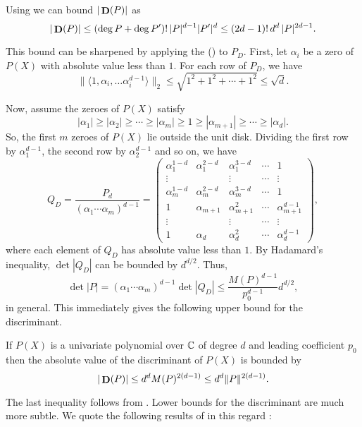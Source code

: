 \medskip
Using  we can bound $|\mathop{\mathbf{D}}\nolimits(P)|$ as
\begin{equation}\label{PB:DiscrmBound1:Eq}
|\mathop{\mathbf{D}}\nolimits(P)| \le (\deg P + \deg P')! \,|P|^{d-1} |P'|^d \le (2d-1)! \,d^d\,
|P|^{2d-1}.
\end{equation}


This bound can be sharpened by applying the 
() to $P_D$.  First, let $\alpha_i$ be a 
zero of $P(X)$ with absolute value less than $1$.  For each row
of $P_D$, we have
\[
\|\langle 1, \alpha_i, \ldots \alpha_i^{d-1} \rangle\|_2
\le \sqrt{1^2 + 1^2 + \cdots + 1^2} \le \sqrt{d}.
\]

Now, assume the zeroes of $P(X)$ satisfy
\[
|\alpha_1| \ge |\alpha_2| \ge \cdots \ge |\alpha_m| \ge 1 \ge |\alpha_{m+1}|
\ge \cdots \ge |\alpha_d|.
\]
So, the first $m$ zeroes of $P(X)$ lie outside the unit disk.
Dividing the first row by $\alpha_1^{d-1}$, the second row by
$\alpha_2^{d-1}$ and so on, we have
\[
Q_D = \frac{P_d}{(\alpha_1 \cdots \alpha_m)^{d-1}} =
\left(\begin{array}{ccccccc}
\alpha_1^{1-d} & \alpha_1^{2-d} & \alpha_1^{3-d} & \cdots & 1 \\
\vdots & & \vdots & \cdots & \vdots \\
\alpha_m^{1-d} & \alpha_m^{2-d} & \alpha_m^{3-d} & \cdots & 1 \\
1 & \alpha_{m+1} & \alpha_{m+1}^2 & \cdots & \alpha_{m+1}^{d-1} \\
\vdots & & \vdots & \cdots & \vdots \\
1 & \alpha_d & \alpha_d^2 & \cdots & \alpha_d^{d-1} 
\end{array}\right),
\]
where each element of $Q_D$ has absolute value less than $1$.  By
Hadamard's inequality, $\det|Q_D|$ can be bounded by $d^{d/2}$.
Thus,
\[
\det|P|= (\alpha_1 \cdots \alpha_m)^{d-1} \det|Q_D| \le 
\frac{M(P)^{d-1}}{p_0^{d-1}} d^{d/2},
\]
in general.  This immediately gives the following upper bound for the
discriminant. 

\begin{proposition}
If $P(X)$ is a univariate polynomial over $\mathbb{C}$ of degree $d$ and
leading coefficient $p_0$ then the absolute value of the discriminant
of $P(X)$ is bounded by
\[
|\mathop{\mathbf{D}}\nolimits(P)| \le d^d M(P)^{2(d-1)} \le d^d \|P\|^{2(d-1)}.
\]
\end{proposition}

The last inequality follows from .  Lower
bounds for the discriminant are much more subtle.  We quote the
following results of {\Odlyzko} in this regard \cite{Odlyzko75,Odlyzko77}:

